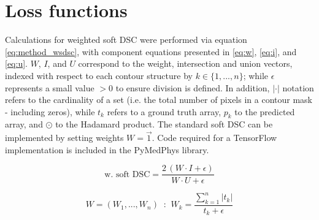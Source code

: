 \section{Loss functions}

Calculations for weighted soft DSC were performed via equation \ref{eq:method_wsdsc}, with component equations presented in \ref{eq:w}, \ref{eq:i}, and \ref{eq:u}. $W$, $I$, and $U$ correspond to the weight, intersection and union vectors, indexed with respect to each contour structure by $k\in\{1,...,n\}$; while $\epsilon$ represents a small value $>0$ to ensure division is defined. In addition, $|\cdot|$ notation refers to the cardinality of a set (i.e. the total number of pixels in a contour mask - including zeros), while $t_{k}$ refers to a ground truth array, $p_{k}$ to the predicted array, and $\odot$ to the Hadamard product. The standard soft DSC can be implemented by setting weights $W=\vec{1}$.  Code required for a TensorFlow implementation is included in the PyMedPhys library.

\begin{equation}
\textrm{w. soft DSC} = \frac{2 \, (W \cdot I + \epsilon)}{W \cdot U + \epsilon}
\label{eq:method_wsdsc}
\end{equation}

\begin{equation}
W = (W_{1}, ..., W_{n}) \; \; \textbf{:} \; \; W_{k} = \frac{\sum_{k=1}^{n} |t_{k} |}{t_{k} + \epsilon}
\label{eq:w}
\end{equation}

